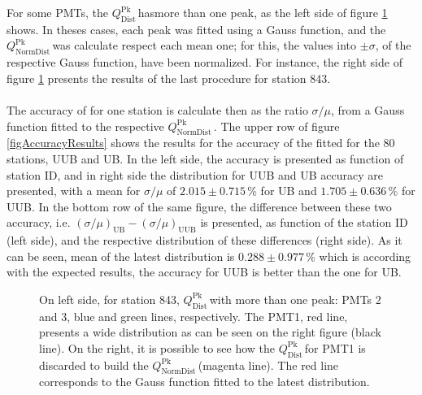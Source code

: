\documentclass[twoside, final, 10pt]{articleMine}
\newcommand{\qpkDist}{$Q^\mathrm{Pk}_\mathrm{Dist}$\,}
\newcommand{\qpkNormDist}{$Q^\mathrm{Pk}_\mathrm{NormDist}$\,}
\begin{document}
\noindent For some PMTs, the \qpkDist hasmore than one peak, as
the left side of figure \ref{figMultipleQpksSt843} shows. In
theses cases, each peak was fitted using a Gauss function, and
the \qpkNormDist was calculate respect each mean one; for this,
the \qpkvem values into $\pm\sigma$, of the respective Gauss
function, have been normalized. For instance, the right side of
figure \ref{figMultipleQpksSt843} presents the results of the
last procedure for station 843.\\\\The accuracy of \qpkvem for
one station is calculate then as the ratio $\sigma/\mu$, from a
Gauss function fitted to the respective \qpkNormDist. The upper
row of figure \ref{figAccuracyResults} shows the results for the
accuracy of the fitted \qpkvem for the $80$ stations, UUB and UB.
In the left side, the accuracy is presented as function of
station ID, and in right side the distribution for UUB and UB
accuracy are presented, with a mean for $\sigma/\mu$ of
$2.015\pm0.715$\,\% for UB and $1.705\pm0.636$\,\% for UUB. In
the bottom row of the same figure, the difference between these
two accuracy, i.e. $\left(\sigma/\mu\right)_{\mathrm{UB}}
-\left(\sigma/\mu\right)_{\mathrm{UUB}}$ is presented, as
function of the station ID (left side), and the respective
distribution of these differences (right side). As it can be
seen, mean of the latest distribution is $0.288\pm0.977$\,\%
which is according with the expected results, the accuracy for
UUB is better than the one for UB.

\begin{figure}[!t]
  \centering
  \caption{On left side, for station 843, \qpkDist with more than
  one peak: PMTs 2 and 3, blue and green lines, respectively. The
  PMT1, red line, presents a wide distribution as can be seen on
  the right figure (black line). On the right, it is possible to
  see how the \qpkDist for PMT1 is discarded to build the
  \qpkNormDist (magenta line). The red line corresponds to
  the Gauss function fitted to the latest distribution.}
  \label{figMultipleQpksSt843}
\end{figure}
\clearpage
\end{document}
